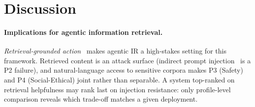 


\section{Discussion}
\label{sec:discussion}

\paragraph{Implications for agentic information retrieval.}
\emph{Retrieval-grounded action}~\cite{xi2024agentir} makes agentic IR a high-stakes setting for this framework. Retrieved content is an attack surface (indirect prompt injection~\cite{greshake2023indirect,zhou2024poisonedrag} is a P2 failure), and natural-language access to sensitive corpora makes P3 (Safety) and P4 (Social-Ethical) joint rather than separable. A system top-ranked on retrieval helpfulness may rank last on injection resistance: only profile-level comparison reveals which trade-off matches a given deployment.
